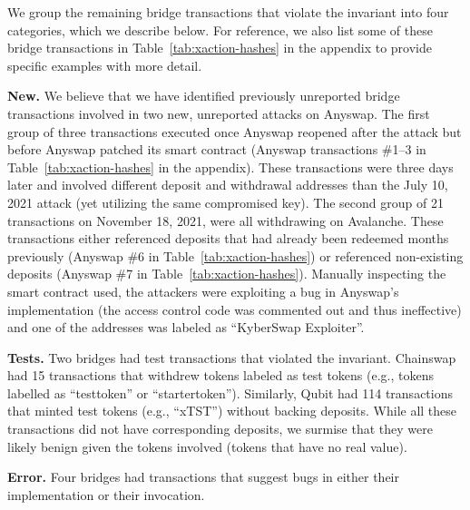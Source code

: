 We group the remaining bridge transactions that violate the invariant
into four categories, which we describe below.  For reference, we also
list some of these bridge transactions in
Table~\ref{tab:xaction-hashes} in the appendix to provide specific
examples with more detail.


\newcommand{\pgraph}[1]{\vspace*{0.1in}\noindent\textbf{#1}}

\pgraph{New.}  We believe that we have identified
previously unreported bridge transactions involved in two new,
unreported attacks on Anyswap.
The first group of three transactions executed once Anyswap reopened
after the attack but before Anyswap patched its smart contract
(Anyswap transactions \#1--3 in Table~\ref{tab:xaction-hashes} in the
appendix).  These transactions were three days later and involved
different deposit and withdrawal addresses than the July 10, 2021
attack (yet utilizing the same compromised key).  The second group of 21 transactions on November 18, 2021,
were all withdrawing on Avalanche.  These
transactions either referenced deposits that had already been redeemed
months previously (Anyswap \#6 in Table~\ref{tab:xaction-hashes}) or referenced non-existing deposits (Anyswap \#7 in Table~\ref{tab:xaction-hashes}).  Manually
inspecting the smart contract used, the attackers were exploiting a
bug in Anyswap's implementation (the access control code was commented
out and thus ineffective) and one of the addresses was labeled as ``KyberSwap Exploiter''. 


\pgraph{Tests.}  Two bridges had test transactions that violated the
invariant.
%
Chainswap had 15 transactions that withdrew tokens labeled as test
tokens (e.g., tokens labelled as ``testtoken'' or ``startertoken''). Similarly, Qubit had 114 transactions that minted test tokens (e.g., ``xTST'') without backing deposits.
While all these transactions did not have corresponding deposits, we surmise that they were likely benign given the tokens involved (tokens that have no real value).




\pgraph{Error.} Four bridges had transactions that suggest bugs in
either their implementation or their invocation.

